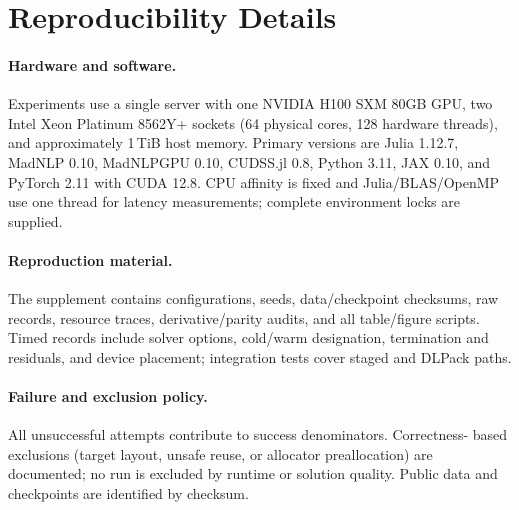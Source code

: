 \section{Reproducibility Details}
\label{app:repro}

\paragraph{Hardware and software.}
Experiments use a single server with one NVIDIA H100 SXM 80GB GPU, two Intel
Xeon Platinum 8562Y+ sockets (64 physical cores, 128 hardware threads), and
approximately 1\,TiB host memory.  Primary versions are Julia 1.12.7, MadNLP
0.10, MadNLPGPU 0.10, CUDSS.jl 0.8, Python 3.11, JAX 0.10, and PyTorch 2.11
with CUDA 12.8.  CPU affinity is fixed and Julia/BLAS/OpenMP use one thread for
latency measurements; complete environment locks are supplied.

\paragraph{Reproduction material.}
The supplement contains configurations, seeds, data/checkpoint checksums, raw
records, resource traces, derivative/parity audits, and all table/figure
scripts.  Timed records include solver options, cold/warm designation,
termination and residuals, and device placement; integration tests cover
staged and DLPack paths.

\paragraph{Failure and exclusion policy.}
All unsuccessful attempts contribute to success denominators.  Correctness-
based exclusions (target layout, unsafe reuse, or allocator preallocation) are
documented; no run is excluded by runtime or solution quality.  Public data and
checkpoints are identified by checksum.

